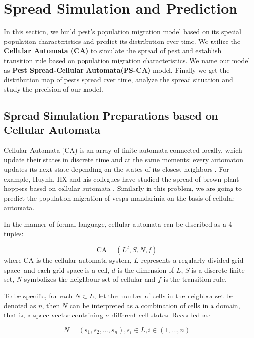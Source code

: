 \section{Spread Simulation and Prediction}
In this section, we build pest's population migration model based on its special population characteristics and predict its distribution over time. We utilize the \textbf{Cellular Automata (CA)} to simulate the spread of pest and establish transition rule based on population migration characteristics. We name our model as \textbf{Pest Spread-Cellular Automata(PS-CA)} model. Finally we get the distribution map of pests spread over time, analyze the spread situation and study the precision of our model.%

\subsection{Spread Simulation Preparations based on Cellular Automata}
Cellular Automata (CA) is an array of finite automata connected locally, which update their states in discrete time and at the same moments; every automaton updates its next state depending on the states of its closest neighbors \parencite{CA}. For example, Huynh, HX and his collegues have studied the spread of brown plant hoppers based on cellular automata \parencite{CAtheorem}. Similarly in this problem, we are going to predict the population migration of vespa mandarinia on the basis of cellular automata.

In the manner of formal language, cellular automata can be discribed as a 4-tuples:

\begin{equation*}
    \text{CA} = (L^d, S, N, f)
\end{equation*}
where CA is the cellular automata system, $L$ represents a regularly divided grid space, and each grid space is a cell, $d$ is the dimension of $L$, $S$ is a discrete finite set, $N$ symbolizes the neighbour set of cellular and $f$ is the transition rule.

To be specific, for each $N \subset L$, let the number of cells in the neighbor set be denoted as $n$, then $N$ can be interpreted as a combination of cells in a domain, that is, a space vector containing $n$ different cell states. Recorded as:

\begin{equation*}
    N = (s_1, s_2, \dots, s_n), s_i \in L, i \in (1, \dots, n)
\end{equation*}

